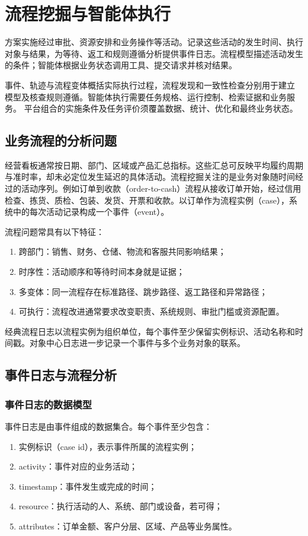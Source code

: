 \chapter{流程挖掘与智能体执行}
\label{ch:week10-process-mining}

方案实施经过审批、资源安排和业务操作等活动。记录这些活动的发生时间、执行
对象与结果，为等待、返工和规则遵循分析提供事件日志。流程模型描述活动发生
的条件；智能体根据业务状态调用工具、提交请求并核对结果。

事件、轨迹与流程变体概括实际执行过程，流程发现和一致性检查分别用于建立
模型及核查规则遵循。智能体执行需要任务规格、运行控制、检索证据和业务服务。
平台组合的实施条件及任务评价须覆盖数据、统计、优化和最终业务状态。

\section{业务流程的分析问题}

经营看板通常按日期、部门、区域或产品汇总指标。这些汇总可反映平均履约周期与准时率，却未必定位发生延迟的具体活动。流程挖掘关注的是业务对象随时间经过的活动序列。例如订单到收款（order-to-cash）流程从接收订单开始，经过信用检查、拣货、质检、包装、发货、开票和收款。以订单作为流程实例（case），系统中的每次活动记录构成一个事件（event）。

流程问题常具有以下特征：
\begin{enumerate}
  \item 跨部门：销售、财务、仓储、物流和客服共同影响结果；
  \item 时序性：活动顺序和等待时间本身就是证据；
  \item 多变体：同一流程存在标准路径、跳步路径、返工路径和异常路径；
  \item 可执行：流程改进通常要求改变职责、系统规则、审批门槛或资源配置。
\end{enumerate}

经典流程日志以流程实例为组织单位，每个事件至少保留实例标识、活动名称和时间戳。对象中心日志进一步记录一个事件与多个业务对象的联系。

\section{事件日志与流程分析}
\subsection{事件日志的数据模型}

\begin{definition}[经典案例中心事件日志]
事件日志是由事件组成的数据集合。每个事件至少包含：
\begin{enumerate}
  \item 实例标识（case id），表示事件所属的流程实例；
  \item activity：事件对应的业务活动；
  \item timestamp：事件发生或完成的时间；
  \item resource：执行活动的人、系统、部门或设备，若可得；
  \item attributes：订单金额、客户分层、区域、产品等业务属性。
\end{enumerate}
\end{definition}

